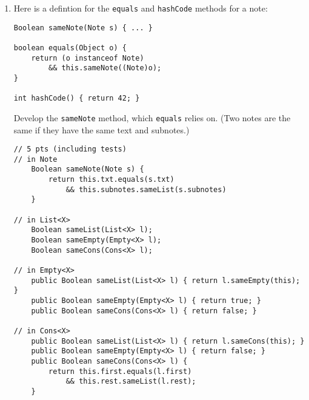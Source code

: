 \documentclass[12pt]{article}                   %
\newenvironment{solution}{\color{Red}}{}
\begin{document}
\begin{problem}
\begin{enumerate}


\ifrubric
\else
{}
\fi
\newpage

\noindent
\item Here is a defintion for the \texttt{equals} and \texttt{hashCode}
methods for a note:

\begin{verbatim}
Boolean sameNote(Note s) { ... }

boolean equals(Object o) {
    return (o instanceof Note) 
        && this.sameNote((Note)o);
}

int hashCode() { return 42; }
\end{verbatim}

\noindent
Develop the \texttt{sameNote} method, which \texttt{equals} relies on.
(Two notes are the same if they have the same text and subnotes.)

\ifrubric
\else
{}
\fi

\begin{solution}
\begin{verbatim}
// 5 pts (including tests)
// in Note
    Boolean sameNote(Note s) {
        return this.txt.equals(s.txt)
            && this.subnotes.sameList(s.subnotes)
    }

// in List<X>
    Boolean sameList(List<X> l);
    Boolean sameEmpty(Empty<X> l);
    Boolean sameCons(Cons<X> l);

// in Empty<X>
    public Boolean sameList(List<X> l) { return l.sameEmpty(this); }
    public Boolean sameEmpty(Empty<X> l) { return true; }
    public Boolean sameCons(Cons<X> l) { return false; }

// in Cons<X>
    public Boolean sameList(List<X> l) { return l.sameCons(this); }
    public Boolean sameEmpty(Empty<X> l) { return false; }
    public Boolean sameCons(Cons<X> l) { 
        return this.first.equals(l.first)
            && this.rest.sameList(l.rest);
    }
\end{verbatim}
\end{solution}


\end{enumerate}
\end{problem}
\end{document}
